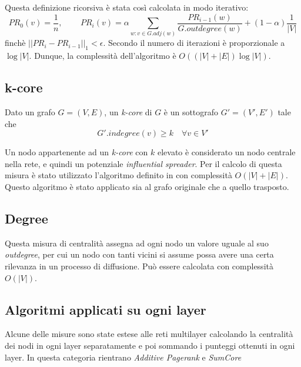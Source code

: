 Questa definizione ricorsiva è stata così calcolata in modo iterativo: 
\begin{equation}
    PR_0(v) = \frac{1}{n} \text{, } \qquad
    PR_i(v) = \alpha \sum_{w : v \in G.adj(w)} 
    \frac{PR_{i-1}(w)}{G.outdegree(w)} + 
    (1-\alpha)\frac{1}{|V|}
\end{equation}
finchè $||PR_{i} - PR_{i-1}||_1 < \epsilon$. Secondo \cite{page:pagerank} il numero di iterazioni 
è proporzionale a $\log{|V|}$. Dunque, la complessità dell'algoritmo è $O((|V| + |E|)\log{|V|})$.


\subsection{k-core}
\begin{definizione}[k-core]
    \label{def:kcore}
    Dato un grafo $G=(V, E)$, un \textit{k-core} di $G$ è un sottografo $G'=(V',E')$
    tale che 
    \begin{equation}
        G'.indegree(v) \geq k \quad \forall v \in V'
    \end{equation}
\end{definizione}

Un nodo appartenente ad un \textit{k-core} con $k$ elevato è considerato un nodo centrale 
nella rete, e quindi un potenziale \textit{influential spreader}.
Per il calcolo di questa misura è stato utilizzato l'algoritmo definito in \cite{batagelj:kcore}
con complessità $O(|V| + |E|)$.
Questo algoritmo è stato applicato sia al grafo originale che a quello trasposto.

\subsection{Degree}
Questa misura di centralità assegna ad ogni nodo un valore uguale al suo \textit{outdegree}, 
per cui un nodo con tanti vicini si assume possa avere una certa rilevanza in un 
processo di diffusione.
Può essere calcolata con complessità $O(|V|)$.

\subsection{Algoritmi applicati su ogni layer}
Alcune delle misure sono state estese alle reti multilayer calcolando la centralità
dei nodi in ogni layer separatamente e poi sommando i punteggi ottenuti in ogni layer.
In questa categoria rientrano \textit{Additive Pagerank}\cite{halu:addpagerank} 
e \textit{SumCore}\cite{basaras:infspmul}

